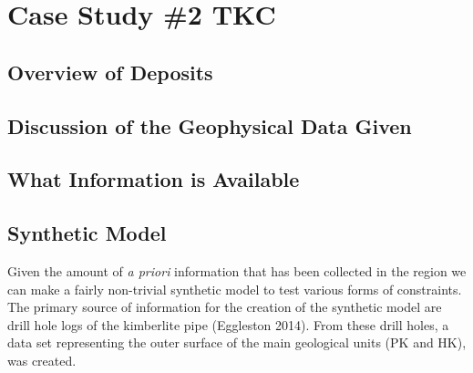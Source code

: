 
\chapter{Case Study \#2 TKC}
\label{ch:CaseStudy2}




\section{Overview of Deposits}
\label{sec:Overview of Deposits:TKC}
%
%
\section{Discussion of the Geophysical Data Given}
\label{sec:Discussion of the Geophysical Data Given:TKC}
%
%

\section{What Information is Available}
\label{sec:What Information is Available:TKC}

%
%

\section{Synthetic Model }
\label{sec:Synthetic Model:TKC}
%
Given the amount of \emph{a priori} information that has been collected in the region we can make a fairly non-trivial synthetic model to test various forms of constraints. The primary source of information for the creation of the synthetic model are drill hole logs of the kimberlite pipe (Eggleston 2014). From these drill holes, a data set representing the outer surface of the main geological units (PK and HK), was created. 

